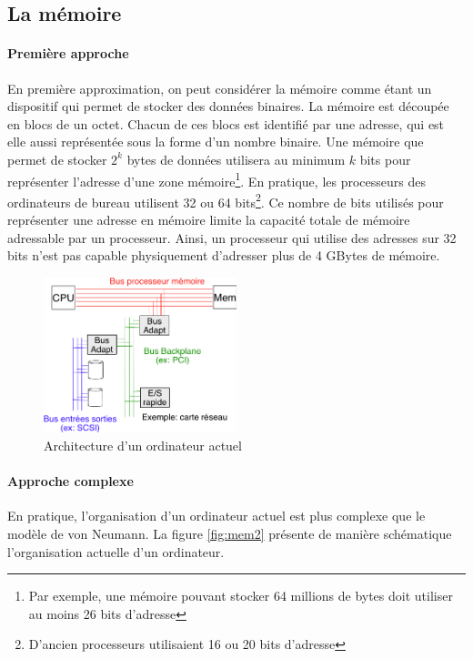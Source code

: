 \subsection{La mémoire}
\paragraph{Première approche} En première approximation, on peut considérer la mémoire comme étant un dispositif qui permet de stocker des données binaires.
La mémoire est découpée en blocs de un octet.
Chacun de ces blocs est identifié par une adresse, qui est elle aussi représentée sous la forme d'un nombre binaire.
Une mémoire que permet de stocker $2^k$ bytes de données utilisera au minimum $k$ bits pour représenter l'adresse d'une zone mémoire\footnote{Par exemple, une mémoire pouvant stocker 64 millions de bytes doit utiliser au moins 26 bits d'adresse}.
En pratique, les processeurs des ordinateurs de bureau utilisent 32 ou 64 bits\footnote{D'ancien processeurs utilisaient 16 ou 20 bits d'adresse}.
Ce nombre de bits utilisés pour représenter une adresse en mémoire limite la capacité totale de mémoire adressable par un processeur.
Ainsi, un processeur qui utilise des adresses sur 32 bits n'est pas capable physiquement d'adresser plus de 4 GBytes de mémoire.


\begin{figure}
  \vspace{-0.5cm}
  \includegraphics[width=0.5\textwidth]{mem2}
  \caption{\label{fig:vanNeumann}Architecture d'un ordinateur actuel}
\end{figure}
\paragraph{Approche complexe} En pratique, l'organisation d'un ordinateur actuel est plus complexe que le modèle de von Neumann.
La figure \ref{fig:mem2} présente de manière schématique l'organisation actuelle d'un ordinateur.

